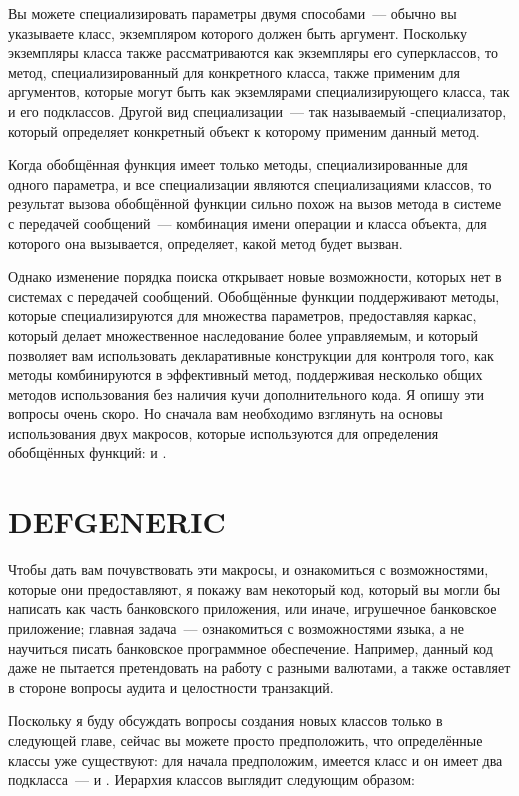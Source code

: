 Вы можете специализировать параметры двумя способами~--- обычно вы указываете класс,
экземпляром которого должен быть аргумент.  Поскольку экземпляры класса также
рассматриваются как экземпляры его суперклассов, то метод, специализированный для
конкретного класса, также применим для аргументов, которые могут быть как экземлярами
специализирующего класса, так и его подклассов.  Другой вид специализации~--- так
называемый -специализатор, который определяет конкретный объект к которому
применим данный метод.

Когда обобщённая функция имеет только методы, специализированные для одного параметра, и
все специализации являются специализациями классов, то результат вызова обобщённой функции
сильно похож на вызов метода в системе с передачей сообщений~--- комбинация имени операции
и класса объекта, для которого она вызывается, определяет, какой метод будет вызван.

Однако изменение порядка поиска открывает новые возможности, которых нет в системах с
передачей сообщений.  Обобщённые функции поддерживают методы, которые специализируются для
множества параметров, предоставляя каркас, который делает множественное наследование более
управляемым, и который позволяет вам использовать декларативные конструкции для контроля
того, как методы комбинируются в эффективный метод, поддерживая несколько общих методов
использования без наличия кучи дополнительного кода. Я опишу эти вопросы очень скоро.  Но
сначала вам необходимо взглянуть на основы использования двух макросов, которые
используются для определения обобщённых функций:  и .

\section{DEFGENERIC}

Чтобы дать вам почувствовать эти макросы, и ознакомиться с возможностями, которые они
предоставляют, я покажу вам некоторый код, который вы могли бы написать как часть
банковского приложения, или иначе, игрушечное банковское приложение; главная задача~---
ознакомиться с возможностями языка, а не научиться писать банковское программное
обеспечение.  Например, данный код даже не пытается претендовать на работу с разными
валютами, а также оставляет в стороне вопросы аудита и целостности транзакций.

Поскольку я буду обсуждать вопросы создания новых классов только в следующей главе, сейчас
вы можете просто предположить, что определённые классы уже существуют: для начала
предположим, имеется класс  и он имеет два подкласса~---
 и .  Иерархия классов выглядит следующим
образом:

